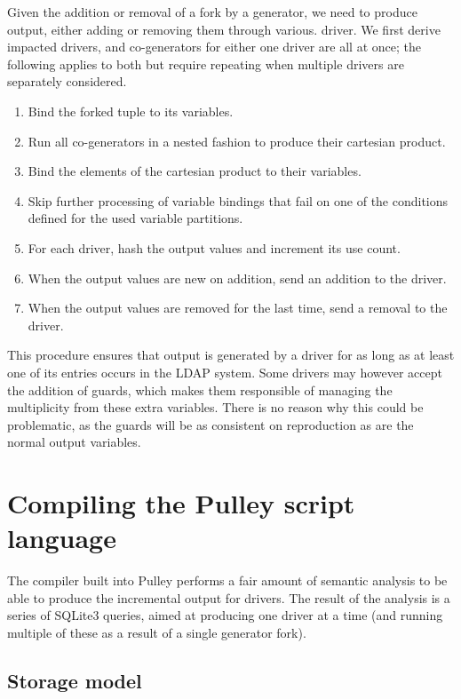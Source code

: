 \documentclass[a4paper]{article}
\begin{document}
Given the addition or removal of a fork by a generator, we need to produce output, either adding or removing them through various. driver.  We first derive impacted drivers, and co-generators for either one driver are all at once; the following applies to both but require repeating when multiple drivers are separately considered.

\begin{enumerate}
\item Bind the forked tuple to its variables.
\item Run all co-generators in a nested fashion to produce their cartesian product.
\item Bind the elements of the cartesian product to their variables.
\item Skip further processing of variable bindings that fail on one of the conditions defined for the used variable partitions.
\item For each driver, hash the output values and increment its use count.
\item When the output values are new on addition, send an addition to the driver.
\item When the output values are removed for the last time, send a removal to the driver.
\end{enumerate}

This procedure ensures that output is generated by a driver for as long as at least one of its entries occurs in the LDAP system.  Some drivers may however accept the addition of guards, which makes them responsible of managing the multiplicity from these extra variables.  There is no reason why this could be problematic, as the guards will be as consistent on reproduction as are the normal output variables.

\section{Compiling the Pulley script language}

The compiler built into Pulley performs a fair amount of semantic analysis to be able to produce the incremental output for drivers.  The result of the analysis is a series of SQLite3 queries, aimed at producing one driver at a time (and running multiple of these as a result of a single generator fork).

\subsection{Storage model}
 
\end{document}
